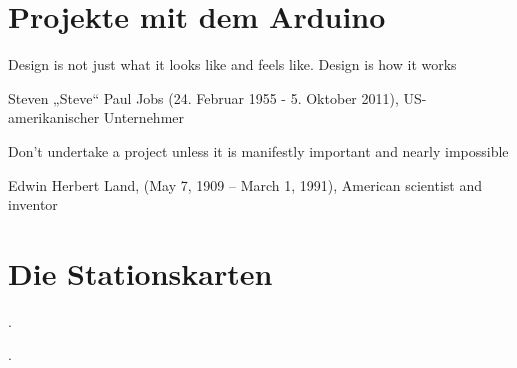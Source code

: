 \documentclass[11pt,openany,twoside]{scrreprt}
\begin{document}
\chapter{Projekte mit dem Arduino}

\epigraph{Design is not just what it looks like and feels like. Design is how it works}{Steven „Steve“ Paul Jobs (24. Februar 1955 - 5. Oktober 2011), US-amerikanischer Unternehmer}
\epigraph{Don't undertake a project unless it is manifestly important and nearly impossible}{Edwin Herbert Land, (May 7, 1909 – March 1, 1991), American scientist and inventor}


\chapter{Die Stationskarten}

\epigraph{.}{.}

\minitoc%




\clearpage 
    \addappheadtotoc
    \appendixpage
    \appendix
    


\newpage
{}




\printindex
\end{document}
